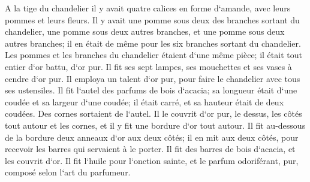 \verse A la tige du chandelier il y avait quatre calices en forme d`amande, avec leurs pommes et leurs fleurs. 
\verse Il y avait une pomme sous deux des branches sortant du chandelier, une pomme sous deux autres branches, et une pomme sous deux autres branches; il en était de même pour les six branches sortant du chandelier. 
\verse Les pommes et les branches du chandelier étaient d`une même pièce; il était tout entier d`or battu, d`or pur. 
\verse Il fit ses sept lampes, ses mouchettes et ses vases à cendre d`or pur. 
\verse Il employa un talent d`or pur, pour faire le chandelier avec tous ses ustensiles. 
\verse Il fit l`autel des parfums de bois d`acacia; sa longueur était d`une coudée et sa largeur d`une coudée; il était carré, et sa hauteur était de deux coudées. Des cornes sortaient de l`autel. 
\verse Il le couvrit d`or pur, le dessus, les côtés tout autour et les cornes, et il y fit une bordure d`or tout autour. 
\verse Il fit au-dessous de la bordure deux anneaux d`or aux deux côtés; il en mit aux deux côtés, pour recevoir les barres qui servaient à le porter. 
\verse Il fit des barres de bois d`acacia, et les couvrit d`or. 
\verse Il fit l`huile pour l`onction sainte, et le parfum odoriférant, pur, composé selon l`art du parfumeur. 

